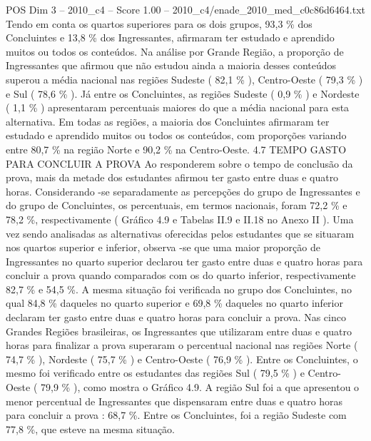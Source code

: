 \begin{textsample}{POS Dim 3 – 2010\_c4 – Score 1.00 – 2010\_c4/enade\_2010\_med\_c0c86d6464.txt}
Tendo em conta os quartos superiores para os dois grupos, 93,3 \% dos Concluintes e 13,8 \% dos Ingressantes, afirmaram ter estudado e aprendido muitos ou todos os conteúdos.
Na análise por Grande Região, a proporção de Ingressantes que afirmou que não estudou ainda a maioria desses conteúdos superou a média nacional nas regiões Sudeste ( 82,1 \% ), Centro-Oeste ( 79,3 \% ) e Sul ( 78,6 \% ).
Já entre os Concluintes, as regiões Sudeste ( 0,9 \% ) e Nordeste ( 1,1 \% ) apresentaram percentuais maiores do que a média nacional para esta alternativa.
Em todas as regiões, a maioria dos Concluintes afirmaram ter estudado e aprendido muitos ou todos os conteúdos, com proporções variando entre 80,7 \% na região Norte e 90,2 \% na Centro-Oeste. 4.7 TEMPO GASTO PARA CONCLUIR A PROVA Ao responderem sobre o tempo de conclusão da prova, mais da metade dos estudantes afirmou ter gasto entre duas e quatro horas.
Considerando -se separadamente as percepções do grupo de Ingressantes e do grupo de Concluintes, os percentuais, em termos nacionais, foram 72,2 \% e 78,2 \%, respectivamente ( Gráfico 4.9 e Tabelas II.9 e II.18 no Anexo II ).
Uma vez sendo analisadas as alternativas oferecidas pelos estudantes que se situaram nos quartos superior e inferior, observa -se que uma maior proporção de Ingressantes no quarto superior declarou ter gasto entre duas e quatro horas para concluir a prova quando comparados com os do quarto inferior, respectivamente 82,7 \% e 54,5 \%.
A mesma situação foi verificada no grupo dos Concluintes, no qual 84,8 \% daqueles no quarto superior e 69,8 \% daqueles no quarto inferior declaram ter gasto entre duas e quatro horas para concluir a prova.
Nas cinco Grandes Regiões brasileiras, os Ingressantes que utilizaram entre duas e quatro horas para finalizar a prova superaram o percentual nacional nas regiões Norte ( 74,7 \% ), Nordeste ( 75,7 \% ) e Centro-Oeste ( 76,9 \% ).
Entre os Concluintes, o mesmo foi verificado entre os estudantes das regiões Sul ( 79,5 \% ) e Centro-Oeste ( 79,9 \% ), como mostra o Gráfico 4.9.
A região Sul foi a que apresentou o menor percentual de Ingressantes que dispensaram entre duas e quatro horas para concluir a prova : 68,7 \%.
Entre os Concluintes, foi a região Sudeste com 77,8 \%, que esteve na mesma situação.

\end{textsample}
